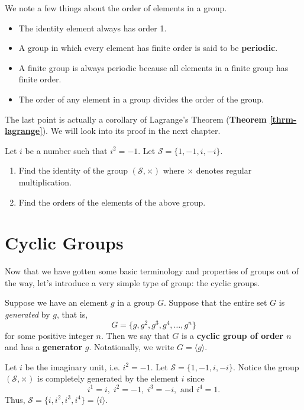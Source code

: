 We note a few things about the order of elements in a group.
\begin{itemize}
    \item The identity element always has order 1.
    \item A group in which every element has finite order is said to be \textbf{periodic}.
    \item A finite group is always periodic because all elements in a finite group has finite order.
    \item The order of any element in a group divides the order of the group.
\end{itemize}
The last point is actually a corollary of Lagrange's Theorem (\textbf{Theorem \ref{thrm-lagrange}}). We will look into its proof in the next chapter.

\begin{exercise}
    Let $i$ be a number such that $i^2 = -1$. Let $\mathcal{S} = \{1, -1, i, -i\}$.
    \begin{enumerate}[label=(\roman*)]
        \item Find the identity of the group $(\mathcal{S}, \times)$ where $\times$ denotes regular multiplication.
        \item Find the orders of the elements of the above group.
    \end{enumerate}
\end{exercise}

\newpage

\section{Cyclic Groups}
Now that we have gotten some basic terminology and properties of groups out of the way, let's introduce a very simple type of group: the cyclic groups.

Suppose we have an element $g$ in a group $G$. Suppose that the entire set $G$ is \textit{generated} by $g$, that is,
\[
    G = \{g, g^2, g^3, g^4, \dots, g^n\}
\]
for some positive integer $n$. Then we say that $G$ is a \textbf{cyclic group of order $n$} and has a \textbf{generator} $g$. Notationally, we write $G = \langle g \rangle$.

\begin{example}
    Let $i$ be the imaginary unit, i.e. $i^2 = -1$. Let $\mathcal{S} = \{1, -1, i, -i\}$. Notice the group $(\mathcal{S}, \times)$ is completely generated by the element $i$ since
    \[
    i^1 = i,\; i^2 = -1,\; i^3 = -i, \text{ and } i^4 = 1.
    \]
    Thus, $\mathcal{S} = \{i, i^2, i^3, i^4\} = \langle i \rangle$.
\end{example}

